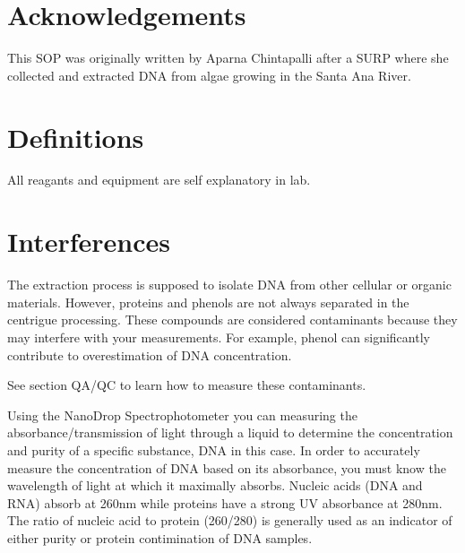 \documentclass[12pt]{../SOP3_alpha}\usepackage[]{graphicx}\usepackage[]{color}
\begin{document}
\tableofcontents

\newpage

\section{Acknowledgements}

This SOP was originally written by Aparna Chintapalli after a SURP where she collected and extracted DNA from algae growing in the Santa Ana River.

\section{Definitions}

\NP All reagants and equipment are self explanatory in lab. 

\section{Interferences}

\NP The extraction process is supposed to isolate DNA from other cellular or organic materials. However, proteins and phenols are not always separated in the centrigue processing. These compounds are considered contaminants because they may interfere with your measurements. For example, phenol can significantly contribute to overestimation of DNA concentration.

\NP See section QA/QC to learn how to measure these contaminants.

\NP Using the NanoDrop Spectrophotometer you can measuring the absorbance/transmission of light through a liquid to determine the concentration and purity of a specific substance, DNA in this case. In order to accurately measure the concentration of DNA based on its absorbance, you must know the wavelength of light at which it maximally absorbs. Nucleic acids (DNA and RNA) absorb at 260nm while proteins have a strong UV absorbance at 280nm. The ratio of nucleic acid to protein (260/280) is generally used as an indicator of either purity or protein contimination of DNA samples.
\end{document}
